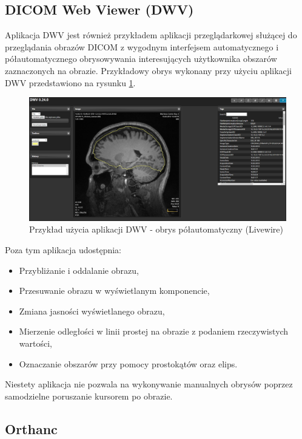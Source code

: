 \documentclass[a4paper,11pt,twoside]{report}
\theoremstyle{definition}
\begin{document}
\subsection {DICOM Web Viewer (DWV)}

Aplikacja DWV jest również przykładem aplikacji przeglądarkowej służącej do przeglądania obrazów DICOM z wygodnym interfejsem automatycznego i półautomatycznego obrysowywania interesujących użytkownika obszarów zaznaczonych na obrazie. Przykładowy obrys wykonany przy użyciu aplikacji DWV przedstawiono na rysunku \ref{fig:DWV-interface}.

\begin{figure}[h]
	\includegraphics[width=\textwidth]{DWV-interface}
	\caption{Przykład użycia aplikacji DWV - obrys półautomatyczny (Livewire)}
    	\label{fig:DWV-interface}
\end{figure}

 Poza tym aplikacja udostępnia:
\begin{itemize}[noitemsep]
\item Przybliżanie i oddalanie obrazu,
\item Przesuwanie obrazu w wyświetlanym komponencie,
\item Zmiana jasności wyświetlanego obrazu,
\item Mierzenie odległości w linii prostej na obrazie z podaniem rzeczywistych wartości,
\item Oznaczanie obszarów przy pomocy prostokątów oraz elips.
\end{itemize}

Niestety aplikacja nie pozwala na wykonywanie manualnych obrysów poprzez samodzielne poruszanie kursorem po obrazie.

\subsection {Orthanc}
\end{document}
